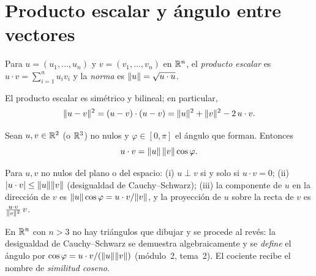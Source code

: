 \section{Producto escalar y ángulo entre vectores}

\begin{definicion}
Para $u=(u_1,\dots,u_n)$ y $v=(v_1,\dots,v_n)$ en $\mathbb{R}^{n}$, el \emph{producto escalar} es $u\cdot v=\sum_{i=1}^{n}u_iv_i$ y la \emph{norma} es $\lVert u\rVert=\sqrt{u\cdot u}$.
\end{definicion}

El producto escalar es simétrico y bilineal; en particular,
\begin{equation}\label{eq:norma-diferencia}
\lVert u-v\rVert^{2}=(u-v)\cdot(u-v)=\lVert u\rVert^{2}+\lVert v\rVert^{2}-2\,u\cdot v .
\end{equation}

\begin{teorema}\label{teo:escalar}
Sean $u,v\in\mathbb{R}^{2}$ (o $\mathbb{R}^{3}$) no nulos y $\varphi\in[0,\pi]$ el ángulo que forman. Entonces
\[
u\cdot v=\lVert u\rVert\,\lVert v\rVert\cos\varphi .
\]
\end{teorema}

\begin{corolario}\label{cor:escalar}
Para $u,v$ no nulos del plano o del espacio: (i) $u\perp v$ si y solo si $u\cdot v=0$; (ii) $\lvert u\cdot v\rvert\le\lVert u\rVert\lVert v\rVert$ (desigualdad de Cauchy--Schwarz); (iii) la componente de $u$ en la dirección de $v$ es $\lVert u\rVert\cos\varphi=u\cdot v/\lVert v\rVert$, y la proyección de $u$ sobre la recta de $v$ es $\frac{u\cdot v}{\lVert v\rVert^{2}}\,v$.
\end{corolario}

En $\mathbb{R}^{n}$ con $n>3$ no hay triángulos que dibujar y se procede al revés: la desigualdad de Cauchy--Schwarz se demuestra algebraicamente y se \emph{define} el ángulo por $\cos\varphi=u\cdot v/(\lVert u\rVert\lVert v\rVert)$ (módulo~2, tema~2). El cociente recibe el nombre de \emph{similitud coseno}.

\addtocounter{definicion}{1}%

\addtocounter{definicion}{1}%

\addtocounter{definicion}{1}%

